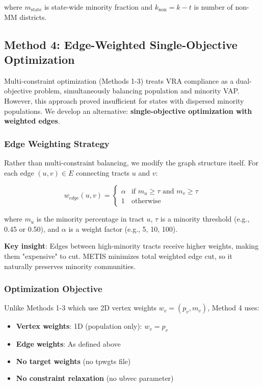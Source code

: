 where $m_{\text{state}}$ is state-wide minority fraction and $k_{\text{non}} = k - t$ is number of non-MM districts.

\subsection{Method 4: Edge-Weighted Single-Objective Optimization}

Multi-constraint optimization (Methods 1-3) treats VRA compliance as a dual-objective problem, simultaneously balancing population and minority VAP. However, this approach proved insufficient for states with dispersed minority populations. We develop an alternative: \textbf{single-objective optimization with weighted edges}.

\subsubsection{Edge Weighting Strategy}

Rather than multi-constraint balancing, we modify the graph structure itself. For each edge $(u, v) \in E$ connecting tracts $u$ and $v$:

\begin{equation}
w_{edge}(u, v) = \begin{cases}
\alpha & \text{if } m_u \geq \tau \text{ and } m_v \geq \tau \\
1 & \text{otherwise}
\end{cases}
\end{equation}

where $m_u$ is the minority percentage in tract $u$, $\tau$ is a minority threshold (e.g., 0.45 or 0.50), and $\alpha$ is a weight factor (e.g., 5, 10, 100).

\textbf{Key insight}: Edges between high-minority tracts receive higher weights, making them "expensive" to cut. METIS minimizes total weighted edge cut, so it naturally preserves minority communities.

\subsubsection{Optimization Objective}

Unlike Methods 1-3 which use 2D vertex weights $w_v = (p_v, m_v)$, Method 4 uses:
\begin{itemize}
\item \textbf{Vertex weights}: 1D (population only): $w_v = p_v$
\item \textbf{Edge weights}: As defined above
\item \textbf{No target weights} (no tpwgts file)
\item \textbf{No constraint relaxation} (no ubvec parameter)
\end{itemize}

